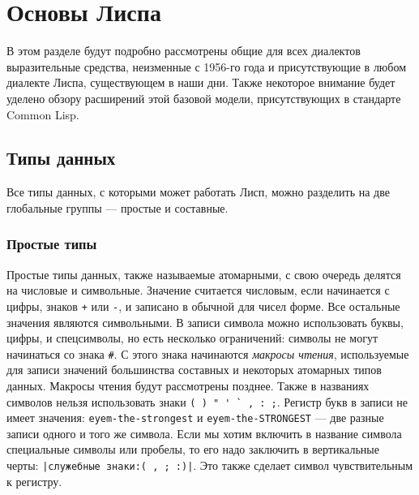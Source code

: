 \documentclass[a4paper, 12pt, titlepage, twoside]{article}
\begin{document}
\section{Основы Лиспа}
В этом разделе будут подробно рассмотрены общие для всех диалектов выразительные средства, неизменные с 1956-го года и присутствующие в любом диалекте Лиспа, существующем в наши дни. Также некоторое внимание будет уделено обзору расширений этой базовой модели, присутствующих в стандарте Common Lisp.
\subsection{Типы данных}
Все типы данных, с которыми может работать Лисп, можно разделить на две глобальные группы --- простые и составные. 
\subsubsection{Простые типы}
Простые типы данных, также называемые атомарными, с свою очередь делятся на числовые и символьные. Значение считается числовым, если начинается с цифры, знаков \verb|+|  или \verb|-|, и записано в обычной для чисел форме. Все остальные значения являются символьными. В записи символа можно использовать буквы, цифры, и спецсимволы, но есть несколько ограничений: символы не могут начинаться со знака \verb|#|. С этого знака начинаются \textit{макросы чтения}, используемые для записи значений большинства составных и некоторых атомарных типов данных. Макросы чтения будут рассмотрены позднее. %
Также в названиях символов нельзя использовать знаки \verb|( ) " ' ` , : ;|. Регистр букв в записи не имеет значения: \verb|eyem-the-strongest| и \verb|eyem-the-STRONGEST| --- две разные записи одного и того же символа. Если мы хотим включить в название символа специальные символы или пробелы, то его надо заключить в вертикальные черты: \verb#|служебные знаки:( , ; :)|#. Это также сделает символ чувствительным к регистру.
\end{document}
